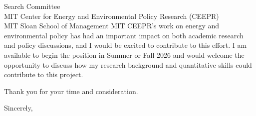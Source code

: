 \documentclass[11pt]{letter}
\begin{document}
\begin{letter}{Search Committee \\
MIT Center for Energy and Environmental Policy Research (CEEPR) \\
MIT Sloan School of Management}
MIT CEEPR’s work on energy and environmental policy has had an important impact on both academic research and policy discussions, and I would be excited to contribute to this effort. I am available to begin the position in Summer or Fall 2026 and would welcome the opportunity to discuss how my research background and quantitative skills could contribute to this project.

Thank you for your time and consideration.

\closing{Sincerely,}

\end{letter}
\end{document}

